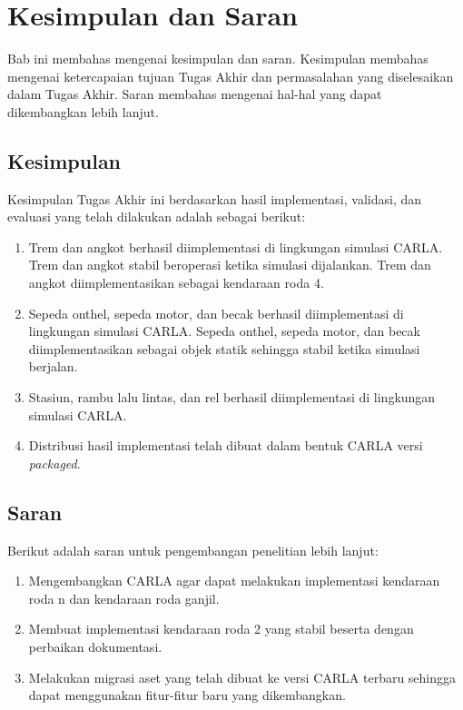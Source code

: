 \chapter{Kesimpulan dan Saran}

Bab ini membahas mengenai kesimpulan dan saran. Kesimpulan membahas mengenai
ketercapaian tujuan Tugas Akhir dan permasalahan yang diselesaikan dalam Tugas
Akhir. Saran membahas mengenai hal-hal yang dapat dikembangkan lebih lanjut.

\section{Kesimpulan}

Kesimpulan Tugas Akhir ini berdasarkan hasil implementasi, validasi, dan
evaluasi yang telah dilakukan adalah sebagai berikut:

\begin{enumerate}
	\item Trem dan angkot berhasil diimplementasi di lingkungan simulasi CARLA.
	Trem dan angkot stabil beroperasi ketika simulasi dijalankan. Trem dan
	angkot diimplementasikan sebagai kendaraan roda 4.

	\item Sepeda onthel, sepeda motor, dan becak berhasil diimplementasi di
	lingkungan simulasi CARLA. Sepeda onthel, sepeda motor, dan becak diimplementasikan
	sebagai objek statik sehingga stabil ketika simulasi berjalan.

	\item Stasiun, rambu lalu lintas, dan rel berhasil diimplementasi di
	lingkungan simulasi CARLA.

	\item Distribusi hasil implementasi telah dibuat dalam bentuk CARLA versi
	\textit{packaged}.

\end{enumerate}

\section{Saran}

Berikut adalah saran untuk pengembangan penelitian lebih lanjut:

\begin{enumerate}
	\item Mengembangkan CARLA agar dapat melakukan implementasi kendaraan roda
	n dan kendaraan roda ganjil.
	\item Membuat implementasi kendaraan roda 2 yang stabil beserta dengan
	perbaikan dokumentasi.
	\item Melakukan migrasi aset yang telah dibuat ke versi CARLA terbaru
	sehingga dapat menggunakan fitur-fitur baru yang dikembangkan.
\end{enumerate}
